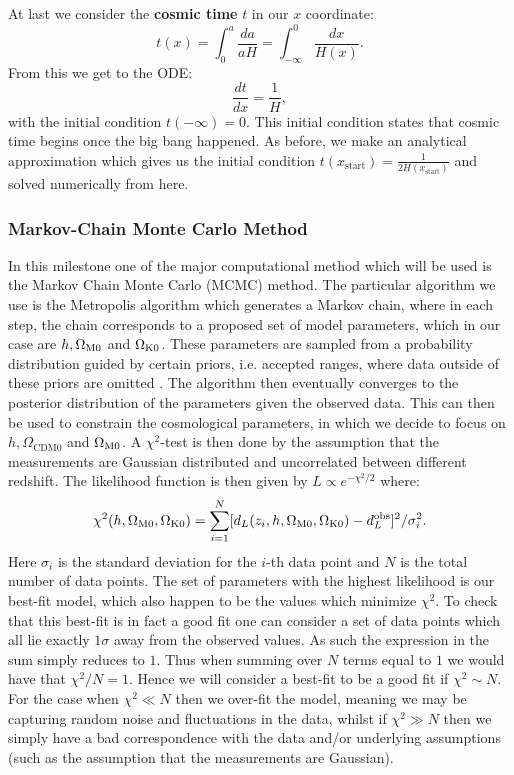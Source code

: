 \documentclass[%
reprint,
 amsmath,amssymb,
 aps,
]{revtex4-2}
\begin{document}
At last we consider the \textbf{cosmic time} $t$ in our $x$ coordinate:
\[t(x)=\int_0^a\frac{da}{aH}=\int_{-\infty}^0\frac{dx}{H(x)}.\]
From this we get to the ODE:
\begin{equation}
	\frac{dt}{dx}=\frac{1}{H}, \label{eq:dtdx}
\end{equation}
with the initial condition $t(-\infty)=0$. This initial condition states that cosmic time begins once the big bang happened. As before, we make an analytical approximation which gives us the initial condition $t(x_\text{start})=\frac{1}{2H(x_\text{start})}$ and solved numerically from here.

\subsubsection{Markov-Chain Monte Carlo Method}
In this milestone one of the major computational method which will be used is the Markov Chain Monte Carlo (MCMC) method. The particular algorithm we use is the Metropolis algorithm which generates a Markov chain, where in each step, the chain corresponds to a proposed set of model parameters, which in our case are $h, \Omega_{\text M0}$ and $\Omega_{\text K0}$. These parameters are sampled from a probability distribution guided by certain priors, i.e. accepted ranges, where data outside of these priors are omitted . The algorithm then eventually converges to the posterior distribution of the parameters given the observed data. This can then be used to constrain the cosmological parameters, in which we decide to focus on $h, \Omega_{\text{CDM}0}$ and $\Omega_{\text M0}$. A $\chi^2$-test is then done by the assumption that the measurements are Gaussian distributed and uncorrelated between different redshift. The likelihood function is then given by $L\propto e^{-\chi^2/2}$ where:
\[\chi^2(h,\Omega_{\text M0},\Omega_{\text K0})=\sum_{i=1}^N[d_L(z_i,h,\Omega_{\text M0},\Omega_{\text K0})-d_L^\text{obs}]^2/\sigma_i^2.\]
Here $\sigma_i$ is the standard deviation for the $i$-th data point and $N$ is the total number of data points. The set of parameters with the highest likelihood is our best-fit model, which also happen to be the values which minimize $\chi^2$. To check that this best-fit is in fact a good fit one can consider a set of data points which all lie exactly $1\sigma$ away from the observed values. As such the expression in the sum simply reduces to $1$. Thus when summing over $N$ terms equal to $1$ we would have that $\chi^2/N=1$. Hence we will consider a best-fit to be a good fit if $\chi^2\sim N$. For the case when $\chi^2\ll N$ then we over-fit the model, meaning we may be capturing random noise and fluctuations in the data, whilst if $\chi^2\gg N$ then we simply have a bad correspondence with the data and/or underlying assumptions (such as the assumption that the measurements are Gaussian).
\end{document}
